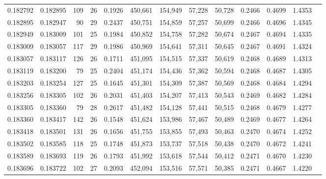 \begin{tabular}{rrrrrrrrrrrrr}
0.182792 & 0.182895 & 109 &  26 &                                     0.1926 & 450,661 & 154,949 &  57,228 &  50,728 & 0.2466 & 0.4699 & 1.4353 \\
0.182895 & 0.182947 &  90 &  29 &                                     0.2437 & 450,751 & 154,859 &  57,257 &  50,699 & 0.2466 & 0.4696 & 1.4345 \\
0.182949 & 0.183009 & 101 &  25 &                                     0.1984 & 450,852 & 154,758 &  57,282 &  50,674 & 0.2467 & 0.4694 & 1.4335 \\
0.183009 & 0.183057 & 117 &  29 &                                     0.1986 & 450,969 & 154,641 &  57,311 &  50,645 & 0.2467 & 0.4691 & 1.4324 \\
0.183057 & 0.183117 & 126 &  26 &                                     0.1711 & 451,095 & 154,515 &  57,337 &  50,619 & 0.2468 & 0.4689 & 1.4313 \\
0.183119 & 0.183200 &  79 &  25 &                                     0.2404 & 451,174 & 154,436 &  57,362 &  50,594 & 0.2468 & 0.4687 & 1.4305 \\
0.183203 & 0.183254 & 127 &  25 &                                     0.1645 & 451,301 & 154,309 &  57,387 &  50,569 & 0.2468 & 0.4684 & 1.4294 \\
0.183256 & 0.183305 & 102 &  26 &                                     0.2031 & 451,403 & 154,207 &  57,413 &  50,543 & 0.2469 & 0.4682 & 1.4284 \\
0.183305 & 0.183360 &  79 &  28 &                                     0.2617 & 451,482 & 154,128 &  57,441 &  50,515 & 0.2468 & 0.4679 & 1.4277 \\
0.183360 & 0.183417 & 142 &  26 &                                     0.1548 & 451,624 & 153,986 &  57,467 &  50,489 & 0.2469 & 0.4677 & 1.4264 \\
0.183418 & 0.183501 & 131 &  26 &                                     0.1656 & 451,755 & 153,855 &  57,493 &  50,463 & 0.2470 & 0.4674 & 1.4252 \\
0.183502 & 0.183585 & 118 &  25 &                                     0.1748 & 451,873 & 153,737 &  57,518 &  50,438 & 0.2470 & 0.4672 & 1.4241 \\
0.183589 & 0.183693 & 119 &  26 &                                     0.1793 & 451,992 & 153,618 &  57,544 &  50,412 & 0.2471 & 0.4670 & 1.4230 \\
0.183696 & 0.183722 & 102 &  27 &                                     0.2093 & 452,094 & 153,516 &  57,571 &  50,385 & 0.2471 & 0.4667 & 1.4220 \\

\end{tabular}
